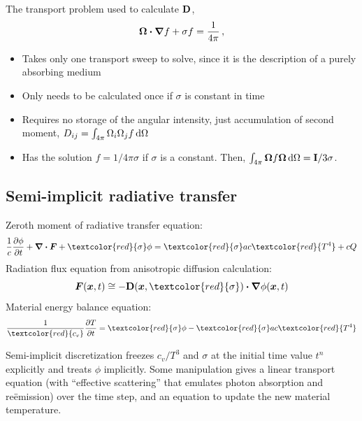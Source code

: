 \documentclass{beamer}
\begin{document}
\begin{frame}
  The transport problem used to calculate $\mathbf{D}$,
  \begin{equation*}
    \bm{\Omega}\bm{\cdot} \bm{\nabla} f + \sigma f = \frac{1}{4\pi} \,,
  \end{equation*}
  \vspace{-\baselineskip}
  \begin{itemize}
    \item Takes only one transport sweep to solve, since it is the description
      of a purely absorbing medium
    \item Only needs to be calculated once if $\sigma$ is constant in time
    \item Requires no storage of the angular intensity, just accumulation of
      second
      moment, $D_{ij} = \int_{4\pi} \Omega_i \Omega_j f \mathop{}\!\mathrm{d} \Omega$
    \item Has the solution $f=1/4\pi\sigma$ if $\sigma$ is a constant.
      Then, $\int_{4\pi} \bm{\Omega} f \bm{\Omega} \mathop{}\!\mathrm{d} \Omega =
      \mathbf{I}/3\sigma$.
  \end{itemize}
\end{frame}

\subsection{Semi-implicit radiative transfer}
\begin{frame}
Zeroth moment of radiative transfer equation:
\begin{equation*}
  \frac{1}{c} \pder{\phi}{t}
  + \del \vd \vec{F} + \textcolor{red}{\sigma} \phi
  = \textcolor{red}{\sigma} ac\textcolor{red}{T^4}
  + c Q
\end{equation*}
Radiation flux equation from anisotropic diffusion calculation:
\begin{equation*}
 \vec{F}(\vec{x}, t) \cong - \Dtens(\vec{x},\textcolor{red}{\sigma})
  \vd \del \phi(\vec{x}, t)
\end{equation*}
Material energy balance equation:
\begin{equation*}
  \frac{1}{\textcolor{red}{c_v}}\pder{T}{t} = \textcolor{red}{\sigma} \phi -
  \textcolor{red}{\sigma} ac\textcolor{red}{T^4}
\end{equation*}

Semi-implicit discretization freezes $c_v/T^3$ and $\sigma$ at the initial time
value $t^n$ explicitly and treats $\phi$ implicitly. Some
manipulation gives a linear transport equation (with ``effective scattering''
that emulates photon absorption and re\"emission) over the time step, and an
equation to update the new material temperature.
\end{frame}
\end{document}
